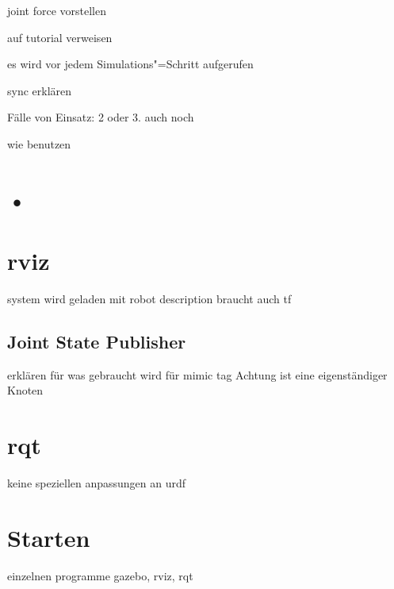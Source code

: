 joint force vorstellen

auf tutorial verweisen

es wird vor jedem Simulations"=Schritt aufgerufen

sync erklären

Fälle von Einsatz: 2 oder 3. auch noch

wie benutzen 


\section{•}


\section{rviz}
system wird geladen mit robot description
braucht auch tf

\subsection{Joint State Publisher}
erklären für was gebraucht wird
für mimic tag
Achtung ist eine eigenständiger Knoten


\section{rqt}
keine speziellen anpassungen an urdf 

\section{Starten}
einzelnen programme gazebo, rviz, rqt


